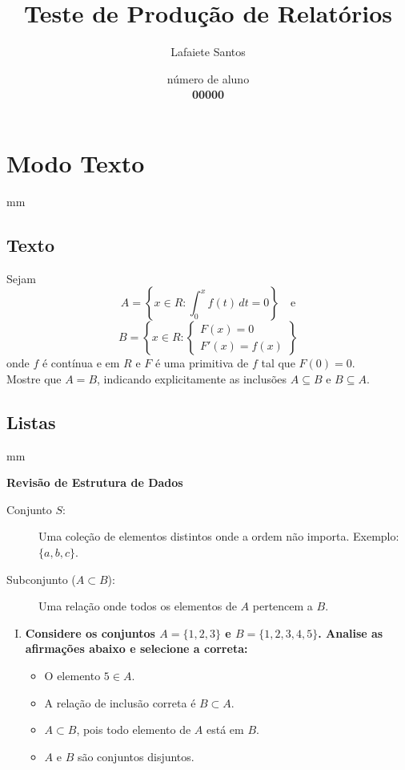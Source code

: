 \documentclass[11pt,a4paper]{report}
\title{\bf Teste de Produção de Relatórios}
\author{Lafaiete Santos}
\date{número de aluno \\ \bf 00000}
\begin{document}
\maketitle

\chapter{Modo Texto}
 mm

\section{Texto}
\noindent Sejam
$$
A = \left\{ x \in R : \int_{0}^{x} f(t)\,dt = 0 \right\}
\quad\text{e}$$
$$
B = \left\{x \in R :
\begin{cases}
F(x) = 0\\
F'(x) = f(x)
\end{cases}
\right\}$$
\noindent onde $f$ é contínua e em $R$ e $F$ é uma primitiva de $f$ tal que $F(0)=0$.\\
\noindent Mostre que $A = B$, indicando explicitamente as inclusões $A \subseteq B$ e $B \subseteq A$.

\section{Listas}
 mm

\begin{flushright}
\Large \bf Revisão de Estrutura de Dados
\end{flushright}

\begin{description}
\item[Conjunto $S$:] Uma coleção de elementos distintos onde a ordem não importa. Exemplo: $\{a,b,c\}$.
\item[Subconjunto ($A \subset B$):] Uma relação onde todos os elementos de $A$ pertencem a $B$.
\end{description}

\begin{enumerate}[I.]
\item \textbf{Considere os conjuntos $A=\{1,2,3\}$ e $B=\{1,2,3,4,5\}$. Analise as afirmações abaixo e selecione a correta:}
\begin{itemize}
\item[$\square$]O elemento $5 \in A$.
\item[$\triangle$]A relação de inclusão correta é $B \subset A$.
\item[$\triangledown$]$A \subset B$, pois todo elemento de $A$ está em $B$.
\item[$\diamondsuit$]$A$ e $B$ são conjuntos disjuntos.
\end{itemize} 
\end{enumerate}
\end{document}
